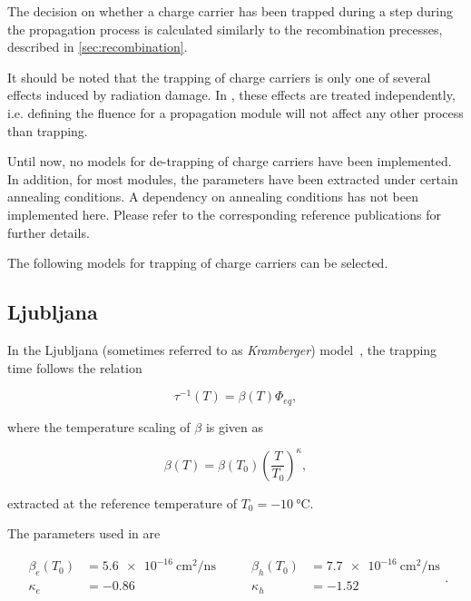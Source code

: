The decision on whether a charge carrier has been trapped during a step during the propagation process is calculated similarly to the recombination precesses, described in \ref{sec:recombination}.

It should be noted that the trapping of charge carriers is only one of several effects induced by radiation damage.
In \apsq, these effects are treated independently, i.e. defining the fluence for a propagation module will not affect any other process than trapping.

Until now, no models for de-trapping of charge carriers have been implemented.
In addition, for most modules, the parameters have been extracted under certain annealing conditions.
A dependency on annealing conditions has not been implemented here.
Please refer to the corresponding reference publications for further details.

The following models for trapping of charge carriers can be selected.

\subsection{Ljubljana}
\label{sec:trap:ljubljana}

In the Ljubljana (sometimes referred to as \textit{Kramberger}) model~\cite{kramberger}, the trapping time follows the relation

\begin{equation*}
    \tau^{-1}(T) = \beta(T)\Phi_{eq} ,
\end{equation*}

where the temperature scaling of $\beta$ is given as

\begin{equation*}
  \beta(T) = \beta(T_0)\left(\frac{T}{T_0}\right)^{\kappa},
\end{equation*}

extracted at the reference temperature of $T_0 = \SI{-10}{\celsius}$.

The parameters used in \apsq are

\begin{equation*}
    \begin{split}
        \beta_{e}(T_0) &= \SI{5.6e-16}{\cm^2 \per \ns} \\
        \kappa_{e}   &= -0.86 \\
    \end{split}
    \qquad
    \begin{split}
        \beta_{h}(T_0) &= \SI{7.7e-16}{\cm^2 \per \ns} \\
        \kappa_{h}   &= -1.52 \\
    \end{split}.
\end{equation*}

